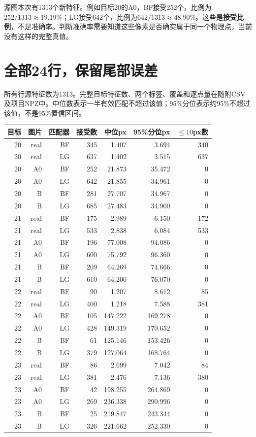\documentclass[UTF8,11pt,a4paper]{ctexart}
\begin{document}
源图本次有1313个新特征。例如目标20的A0，BF接受252个，比例为$252/1313\approx19.19\%$；LG接受642个，比例为$642/1313\approx48.90\%$。这些是\textbf{接受比例}，不是准确率。判断准确率需要知道这些像素是否确实属于同一个物理点，当前没有这样的完整真值。
\clearpage
\section{全部24行，保留尾部误差}
所有行源特征数为1313。完整目标特征数、两个标签、覆盖和逐点量在随附CSV及项目NPZ中。中位数表示一半有效匹配不超过该值；95\%分位表示约95\%不超过该值，不是95\%置信区间。
\small
\begin{longtable}{rrrrrrr}
\toprule 目标 & 图片 & 匹配器 & 接受数 & 中位px & 95\%分位px & $\le10$px数\\\midrule\endhead
20 & real & BF & 345 & 1.407 & 3.694 & 340 \\
20 & real & LG & 637 & 1.402 & 3.515 & 637 \\
20 & A0 & BF & 252 & 21.873 & 35.472 & 0 \\
20 & A0 & LG & 642 & 21.855 & 34.961 & 0 \\
20 & B & BF & 281 & 27.707 & 34.967 & 0 \\
20 & B & LG & 685 & 27.483 & 34.900 & 0 \\
21 & real & BF & 175 & 2.989 & 6.150 & 172 \\
21 & real & LG & 533 & 2.838 & 6.084 & 533 \\
21 & A0 & BF & 196 & 77.008 & 94.086 & 0 \\
21 & A0 & LG & 600 & 75.792 & 96.360 & 0 \\
21 & B & BF & 209 & 64.269 & 74.666 & 0 \\
21 & B & LG & 610 & 64.200 & 76.070 & 0 \\
22 & real & BF & 90 & 1.207 & 8.612 & 85 \\
22 & real & LG & 400 & 1.218 & 7.588 & 381 \\
22 & A0 & BF & 105 & 147.222 & 169.278 & 0 \\
22 & A0 & LG & 428 & 149.319 & 170.652 & 0 \\
22 & B & BF & 61 & 125.146 & 153.426 & 0 \\
22 & B & LG & 379 & 127.064 & 168.764 & 0 \\
23 & real & BF & 86 & 2.699 & 7.042 & 84 \\
23 & real & LG & 381 & 2.476 & 7.136 & 380 \\
23 & A0 & BF & 42 & 198.255 & 264.869 & 0 \\
23 & A0 & LG & 269 & 236.338 & 290.996 & 0 \\
23 & B & BF & 25 & 219.847 & 243.344 & 0 \\
23 & B & LG & 326 & 221.662 & 252.330 & 0 \\
\bottomrule\end{longtable}\normalsize
\clearpage
\end{document}
